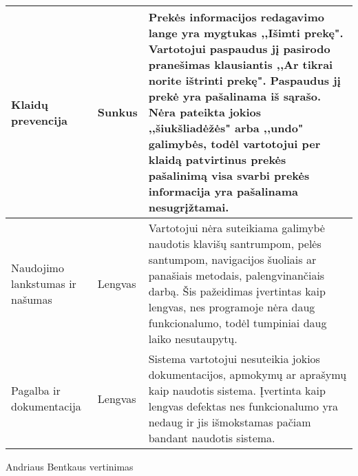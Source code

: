 \documentclass[oneside]{VUMIFPSkursinis}
\begin{document}
\begin{center}
    \begin{tabular}{ |p{3cm}| p{3cm} | p{11cm} | }
	\hline
	Klaidų prevencija & Sunkus & Prekės informacijos redagavimo lange yra mygtukas ,,Išimti prekę". 
					Vartotojui paspaudus jį pasirodo pranešimas klausiantis ,,Ar tikrai norite ištrinti prekę". 
					Paspaudus jį prekė yra pašalinama iš sąrašo.
					Nėra pateikta jokios ,,šiukšliadėžės" arba ,,undo" galimybės, todėl vartotojui per klaidą patvirtinus prekės pašalinimą visa svarbi prekės informacija yra pašalinama nesugrįžtamai. \\ \hline
	Naudojimo lankstumas ir našumas & Lengvas & Vartotojui nėra suteikiama galimybė naudotis klavišų santrumpom, pelės santumpom, navigacijos šuoliais ar panašiais metodais, palengvinančiais darbą.
								Šis pažeidimas įvertintas kaip lengvas, nes programoje nėra daug funkcionalumo, todėl tumpiniai daug laiko nesutaupytų. \\ \hline
	Pagalba ir dokumentacija & Lengvas & Sistema vartotojui nesuteikia jokios dokumentacijos, apmokymų ar aprašymų kaip naudotis sistema. 
							Įvertinta kaip lengvas defektas nes funkcionalumo yra nedaug ir jis išmokstamas pačiam bandant naudotis sistema. \\ \hline
   \hline
    \end{tabular}
\end{center}
Andriaus Bentkaus vertinimas
\end{document}
